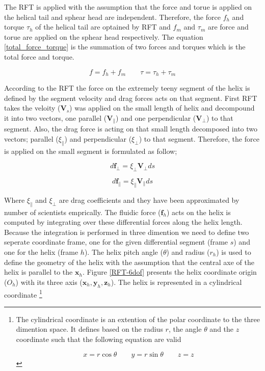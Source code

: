 \documentclass[12pt,a4paper,titlepage]{report}
\begin{document}
The \ac*{RFT} is applied with the assumption that the force and torue is applied on the helical tail and sphear
head are independent. Therefore, the force $f_h$ and torque $\tau_h$ of the helical tail are optained by \ac*{RFT} 
and $f_m$ and $\tau_m$ are force and torue are applied on the sphear head respectively. 
The equation \ref{total_force_torque} is the summation of two forces and torques which is the total force and torque. 

\begin{equation}
 f = f_h + f_m \qquad  \tau = \tau_h + \tau_m
\label{total_force_torque}
\end{equation}

According to the \ac*{RFT} the force on the extremely teeny segment of the helix is defined by 
the segment velocity and drag forces acts on that segment. First \ac*{RFT} takes the
 veloity ($\bm{V}_s$) was applied on the small length
of helix and decompound it into two vectors, one parallel ($\bm{V}_{\parallel}$) and one perpendicular ($\bm{V}_{\perp}$)
 to that segment. Also, the drag force is acting on that small length decomposed into two 
vectors; parallel (${\xi}_{\parallel}$) and perpendicular (${\xi}_{\perp}$) to that segment.  
Therefore, the force is applied on the small segment is formulated as follow; 

\begin{equation}
 d{\bm{f}_{\perp}} = {\xi}_{\perp}{\bm{V}_{\perp}}ds 
\label{relation-force_drag}
\end{equation}

\begin{equation}
 d{\bm{f}_{\parallel}} = {\xi}_{\parallel}{\bm{V}_{\parallel}}ds
\label{relation-force_drag}
\end{equation}

Where ${\xi}_{\parallel}$ and ${\xi}_{\perp}$ are drag coefficients and they have been approximated by number
of scientists emprically. The fluidic force ($ \bm{f}_h$) acts on the helix is computed by integrating over these 
differential forces along the helix length. Because the integration is performed in three dimention
 we need to define two seperate coordinate frame, one for the given
differential segment (frame $s$) and one for the helix (frame $h$). The helix pitch angle ($\theta$) 
and radius ($r_h$) is used to define the geometry of the helix with the assumption that the central
 axe of the helix is
parallel to the $\bm{x}_h$. Figure \ref{RFT-6dof} presents the helix coordinate origin ($O_h$) with 
its three axis ($\bm{x}_h , \bm{y}_h , \bm{z}_h$). The helix is represented in a cylindrical coordinate
\footnote{The cylindrical coordinate is an extention of the polar coordinate to the three dimention space. It
defines based on the radius $r$, the angle $\theta$ and the $z$ coordinate such that the following equation
are valid

\begin{equation}
 x = r\cos{\theta} \qquad  y = r\sin{\theta}  \qquad  z = z
\label{cylindrical_coordinate}
\end{equation}
}
\end{document}
